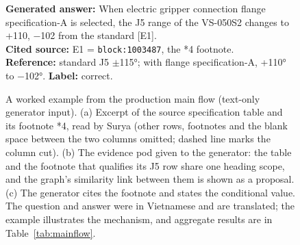 \documentclass[runningheads]{llncs}
\begin{document}
\begin{figure}[!htbp]
\begin{minipage}[t]{0.40\textwidth}
\textbf{Generated answer:} When electric gripper connection flange specification-A is selected, the J5 range of the VS-050S2 changes to +110, $-$102 from the standard [E1].\\[4pt]
\textbf{Cited source:} E1 = \texttt{block:1003487}, the *4 footnote.\\[4pt]
\textbf{Reference:} standard J5 $\pm$115°; with flange specification-A, +110° to $-$102°. \textbf{Label:} correct.
\end{minipage}
\caption{A worked example from the production main flow (text-only generator input). (a) Excerpt of the source specification table and its footnote *4, read by Surya (other rows, footnotes and the blank space between the two columns omitted; dashed line marks the column cut). (b) The evidence pod given to the generator: the table and the footnote that qualifies its J5 row share one heading scope, and the graph's similarity link between them is shown as a proposal. (c) The generator cites the footnote and states the conditional value. The question and answer were in Vietnamese and are translated; the example illustrates the mechanism, and aggregate results are in Table~\ref{tab:mainflow}.}
\label{fig:p044}
\end{figure}
\end{document}
